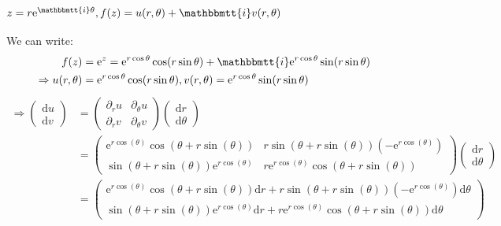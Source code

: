 \documentclass[]{ctexart}
\newcommand{\mi}{\mathbbmtt{i}}
\newcommand{\di}{\mathrm{d}}
\newcommand{\pa}{\partial}
\newcommand{\me}{\mathrm{e}}
\begin{document}
		\subsubsection{$z=r\me ^{\mi \theta},f(z)=u(r,\theta)+\mi v(r,\theta)$}
			We can write:
				\begin{equation*}
				\begin{aligned}
					f(z)&=\me ^z=\me ^{r\cos\theta}\cos(r\sin\theta)+\mi \me ^{r\cos\theta}\sin(r\sin\theta)\\
					\Rightarrow u(r,\theta)&=\me ^{r\cos\theta}\cos(r\sin\theta),v(r,\theta)=\me ^{r\cos\theta}\sin(r\sin\theta)
				\end{aligned}
				\end{equation*}
				\begin{equation*}
				\begin{aligned}
					\Rightarrow 
					\begin{pmatrix}
						\di u\\
						\di v
					\end{pmatrix}
					&=
					\begin{pmatrix}
						\pa_ru & \pa_{\theta}u\\
						\pa_rv & \pa_{\theta}v
					\end{pmatrix}
					\begin{pmatrix}
						\di r\\
						\di \theta
					\end{pmatrix}\\
					&=
					\begin{pmatrix}
						\me^{r \cos (\theta )} \cos (\theta +r \sin (\theta )) & r \sin (\theta +r \sin (\theta )) \left(-\me^{r \cos (\theta )}\right)\\
						\sin (\theta +r \sin (\theta )) \me^{r \cos (\theta )} & r \me^{r \cos (\theta )} \cos (\theta +r \sin (\theta ))
					\end{pmatrix}
					\begin{pmatrix}
						\di r\\
						\di \theta
					\end{pmatrix}\\
					&=
					\begin{pmatrix}
						\me^{r \cos (\theta )} \cos (\theta +r \sin (\theta ))\di r+r \sin (\theta +r \sin (\theta )) \left(-\me^{r \cos (\theta )}\right)\di \theta\\
						\sin (\theta +r \sin (\theta )) \me^{r \cos (\theta )}\di r + r \me^{r \cos (\theta )} \cos (\theta +r \sin (\theta ))\di \theta
					\end{pmatrix}
				\end{aligned}
				\end{equation*}
\end{document}
